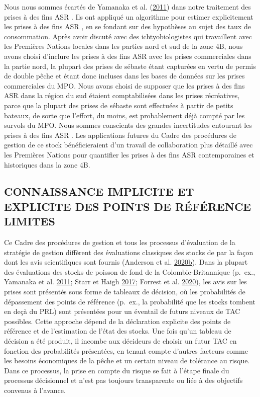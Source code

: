 \documentclass[french,11pt]{book}
\begin{document}
Nous nous sommes écartés de Yamanaka et al. (\protect\hyperlink{ref-yamanaka2011}{2011}) dans notre traitement des prises à des fins ASR . Ils ont appliqué un algorithme pour estimer explicitement les prises à des fins ASR , en se fondant sur des hypothèses au sujet des taux de consommation. Après avoir discuté avec des ichtyobiologistes qui travaillent avec les Premières Nations locales dans les parties nord et sud de la zone 4B, nous avons choisi d'inclure les prises à des fins ASR avec les prises commerciales dans la partie nord, la plupart des prises de sébaste étant capturées en vertu de permis de double pêche et étant donc incluses dans les bases de données sur les prises commerciales du MPO. Nous avons choisi de supposer que les prises à des fins ASR dans la région du sud étaient comptabilisées dans les prises récréatives, parce que la plupart des prises de sébaste sont effectuées à partir de petits bateaux, de sorte que l'effort, du moins, est probablement déjà compté par les survols du MPO. Nous sommes conscients des grandes incertitudes entourant les prises à des fins ASR . Les applications futures du Cadre des procédures de gestion de ce stock bénéficieraient d'un travail de collaboration plus détaillé avec les Premières Nations pour quantifier les prises à des fins ASR contemporaines et historiques dans la zone 4B.

\hypertarget{sec:discussion-implicit}{%
\subsection{CONNAISSANCE IMPLICITE ET EXPLICITE DES POINTS DE RÉFÉRENCE LIMITES}\label{sec:discussion-implicit}}

Ce Cadre des procédures de gestion et tous les processus d'évaluation de la stratégie de gestion diffèrent des évaluations classiques des stocks de par la façon dont les avis scientifiques sont fournis (Anderson et al. \protect\hyperlink{ref-anderson2020gfmp}{2020}\protect\hyperlink{ref-anderson2020gfmp}{b}). Dans la plupart des évaluations des stocks de poisson de fond de la Colombie-Britannique (p.~ex., Yamanaka et al. \protect\hyperlink{ref-yamanaka2011}{2011}; Starr et Haigh \protect\hyperlink{ref-starr2017}{2017}; Forrest et al. \protect\hyperlink{ref-forrest2019}{2020}), les avis sur les prises sont présentés sous forme de tableaux de décision, où les probabilités de dépassement des points de référence (p.~ex., la probabilité que les stocks tombent en deçà du PRL) sont présentées pour un éventail de futurs niveaux de TAC possibles. Cette approche dépend de la déclaration explicite des points de référence et de l'estimation de l'état des stocks. Une fois qu'un tableau de décision a été produit, il incombe aux décideurs de choisir un futur TAC en fonction des probabilités présentées, en tenant compte d'autres facteurs comme les besoins économiques de la pêche et un certain niveau de tolérance au risque. Dans ce processus, la prise en compte du risque se fait à l'étape finale du processus décisionnel et n'est pas toujours transparente ou liée à des objectifs convenus à l'avance.
\end{document}
